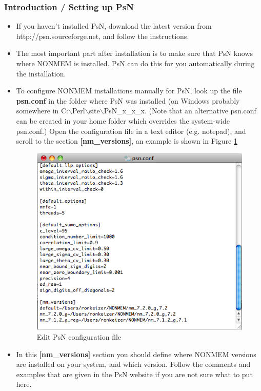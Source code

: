 \subsubsection*{Introduction / Setting up PsN}
\begin{itemize}
\item  If you haven't installed PsN, download the latest
  version from http://psn.sourceforge.net, and follow the
  instructions.
\item The most important part after installation is to make
  sure that PsN knows where NONMEM is installed. PsN can do this for
 you automatically during the installation.
\item To configure NONMEM installations manually for PsN,
 look up the file \textbf{psn.conf} in the folder where PsN
  was installed (on Windows probably somewhere in
  C:$\backslash$Perl$\backslash$site$\backslash$PsN\_x\_x\_x. (Note
  that an alternative psn.conf can be created in your home folder
  which overrides the system-wide psn.conf.) Open the configuration
  file in a text editor (e.g. notepad), and scroll to the section
  \textbf{[nm\_versions]}, an example is shown  in Figure \ref{fig:Fig1}

\begin{figure}[h] \centering
  \includegraphics[scale=.4]{images/psn_conf.png}
  \caption{Edit PsN configuration file\label{fig:Fig1}}
\end{figure}

\item In this \textbf{[nm\_versions]} section you should define where
  NONMEM versions are installed on your system, and which
  version. Follow the comments and examples that are given in the PsN
  website if you are not sure what to put here.

\end{itemize}

